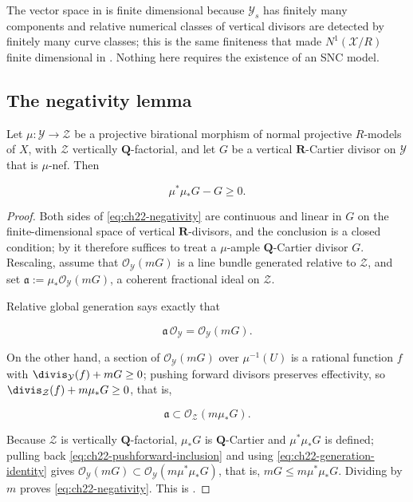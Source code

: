 \begin{remark}
The vector space in  is finite dimensional
because \(\mathcal Y_s\) has finitely many components and relative numerical
classes of vertical divisors are detected by finitely many curve classes;
this is the same finiteness that made \(N^1(\mathcal X/R)\) finite
dimensional in .  Nothing here requires the
existence of an SNC model.
\end{remark}

\subsection{The negativity lemma}

\begin{lemma}
\label{lem:ch22-negativity}
Let \(\mu:\mathcal Y\to\mathcal Z\) be a projective birational morphism of
normal projective \(R\)-models of \(X\), with \(\mathcal Z\) vertically
\(\mathbf Q\)-factorial, and let \(G\) be a vertical \(\mathbf R\)-Cartier
divisor on \(\mathcal Y\) that is \(\mu\)-nef.  Then

\[
                 \mu^*\mu_*G-G\geq0 .
\tag{22.31}\label{eq:ch22-negativity}
\]
\end{lemma}

\begin{proof}
Both sides of \eqref{eq:ch22-negativity} are continuous and linear in \(G\)
on the finite-dimensional space of vertical \(\mathbf R\)-divisors, and the
conclusion is a closed condition; by
 it therefore suffices to treat a
\(\mu\)-ample \(\mathbf Q\)-Cartier divisor \(G\).  Rescaling, assume that
\(\mathcal O_{\mathcal Y}(mG)\) is a line bundle generated relative to
\(\mathcal Z\), and set
\(\mathfrak a:=\mu_*\mathcal O_{\mathcal Y}(mG)\), a coherent fractional
ideal on \(\mathcal Z\).

Relative global generation says exactly that

\[
       \mathfrak a\,\mathcal O_{\mathcal Y}
       =\mathcal O_{\mathcal Y}(mG).
\tag{22.32}\label{eq:ch22-generation-identity}
\]

On the other hand, a section of \(\mathcal O_{\mathcal Y}(mG)\) over
\(\mu^{-1}(U)\) is a rational function \(f\) with
\(\divis_{\mathcal Y}(f)+mG\geq0\); pushing forward divisors preserves
effectivity, so \(\divis_{\mathcal Z}(f)+m\mu_*G\geq0\), that is,

\[
 \mathfrak a\subset\mathcal O_{\mathcal Z}(m\mu_*G).
\tag{22.33}\label{eq:ch22-pushforward-inclusion}
\]

Because \(\mathcal Z\) is vertically \(\mathbf Q\)-factorial, \(\mu_*G\) is
\(\mathbf Q\)-Cartier and \(\mu^*\mu_*G\) is defined; pulling back
\eqref{eq:ch22-pushforward-inclusion} and using
\eqref{eq:ch22-generation-identity} gives
\(\mathcal O_{\mathcal Y}(mG)\subset\mathcal O_{\mathcal Y}(m\mu^*\mu_*G)\),
that is, \(mG\leq m\mu^*\mu_*G\).  Dividing by \(m\) proves
\eqref{eq:ch22-negativity}.  This is \cite[Lemma~1.6]{BFJ16}.
\end{proof}

